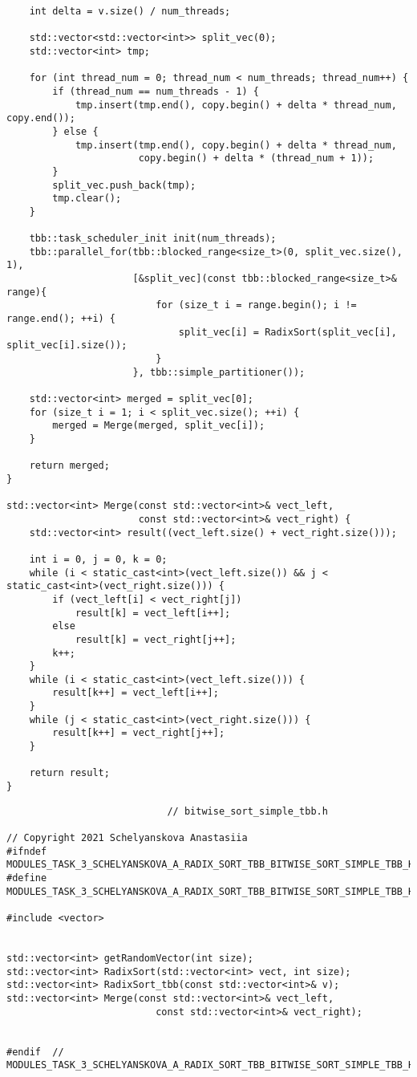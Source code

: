 \documentclass{report}
\begin{document}
\begin{lstlisting}
    int delta = v.size() / num_threads;

    std::vector<std::vector<int>> split_vec(0);
    std::vector<int> tmp;

    for (int thread_num = 0; thread_num < num_threads; thread_num++) {
        if (thread_num == num_threads - 1) {
            tmp.insert(tmp.end(), copy.begin() + delta * thread_num, copy.end());
        } else {
            tmp.insert(tmp.end(), copy.begin() + delta * thread_num,
                       copy.begin() + delta * (thread_num + 1));
        }
        split_vec.push_back(tmp);
        tmp.clear();
    }

    tbb::task_scheduler_init init(num_threads);
    tbb::parallel_for(tbb::blocked_range<size_t>(0, split_vec.size(), 1),
                      [&split_vec](const tbb::blocked_range<size_t>& range){
                          for (size_t i = range.begin(); i != range.end(); ++i) {
                              split_vec[i] = RadixSort(split_vec[i], split_vec[i].size());
                          }
                      }, tbb::simple_partitioner());

    std::vector<int> merged = split_vec[0];
    for (size_t i = 1; i < split_vec.size(); ++i) {
        merged = Merge(merged, split_vec[i]);
    }

    return merged;
}

std::vector<int> Merge(const std::vector<int>& vect_left,
                       const std::vector<int>& vect_right) {
    std::vector<int> result((vect_left.size() + vect_right.size()));

    int i = 0, j = 0, k = 0;
    while (i < static_cast<int>(vect_left.size()) && j < static_cast<int>(vect_right.size())) {
        if (vect_left[i] < vect_right[j])
            result[k] = vect_left[i++];
        else
            result[k] = vect_right[j++];
        k++;
    }
    while (i < static_cast<int>(vect_left.size())) {
        result[k++] = vect_left[i++];
    }
    while (j < static_cast<int>(vect_right.size())) {
        result[k++] = vect_right[j++];
    }

    return result;
}

\end{lstlisting}
\begin{lstlisting}
							// bitwise_sort_simple_tbb.h

// Copyright 2021 Schelyanskova Anastasiia
#ifndef MODULES_TASK_3_SCHELYANSKOVA_A_RADIX_SORT_TBB_BITWISE_SORT_SIMPLE_TBB_H_
#define MODULES_TASK_3_SCHELYANSKOVA_A_RADIX_SORT_TBB_BITWISE_SORT_SIMPLE_TBB_H_

#include <vector>


std::vector<int> getRandomVector(int size);
std::vector<int> RadixSort(std::vector<int> vect, int size);
std::vector<int> RadixSort_tbb(const std::vector<int>& v);
std::vector<int> Merge(const std::vector<int>& vect_left,
                          const std::vector<int>& vect_right);


#endif  // MODULES_TASK_3_SCHELYANSKOVA_A_RADIX_SORT_TBB_BITWISE_SORT_SIMPLE_TBB_H_
\end{lstlisting}
\end{document}

